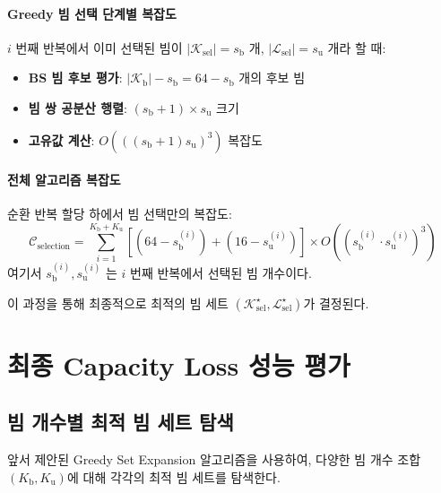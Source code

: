 \documentclass[10pt]{article}
\begin{document}
\paragraph{Greedy 빔 선택 단계별 복잡도}
$i$ 번째 반복에서 이미 선택된 빔이 $|\mathcal{K}_{\text{sel}}| = s_{\text{b}}$ 개, $|\mathcal{L}_{\text{sel}}| = s_{\text{u}}$ 개라 할 때:
\begin{itemize}
    \item \textbf{BS 빔 후보 평가}: $|\mathcal{K}_{\text{b}}| - s_{\text{b}} = 64 - s_{\text{b}}$ 개의 후보 빔
    \item \textbf{빔 쌍 공분산 행렬}: $(s_{\text{b}} + 1) \times s_{\text{u}}$ 크기
    \item \textbf{고유값 계산}: $O(((s_{\text{b}} + 1) s_{\text{u}})^3)$ 복잡도
\end{itemize}

\paragraph{전체 알고리즘 복잡도}
순환 반복 할당 하에서 빔 선택만의 복잡도:
\begin{equation}
\mathcal{C}_{\text{selection}} = \sum_{i=1}^{K_{\text{b}}+K_{\text{u}}} \left[ (64 - s_{\text{b}}^{(i)}) + (16 - s_{\text{u}}^{(i)}) \right] \times O((s_{\text{b}}^{(i)} \cdot s_{\text{u}}^{(i)})^3)
\end{equation}
여기서 $s_{\text{b}}^{(i)}, s_{\text{u}}^{(i)}$ 는 $i$ 번째 반복에서 선택된 빔 개수이다.

이 과정을 통해 최종적으로 최적의 빔 세트 $(\mathcal{K}_{\text{sel}}^{\star}, \mathcal{L}_{\text{sel}}^{\star})$가 결정된다.

\section{최종 Capacity Loss 성능 평가}
\label{sec:objective}

\subsection{빔 개수별 최적 빔 세트 탐색}
앞서 제안된 Greedy Set Expansion 알고리즘을 사용하여, 다양한 빔 개수 조합 $(K_{\text{b}}, K_{\text{u}})$에 대해 각각의 최적 빔 세트를 탐색한다.
\end{document}
